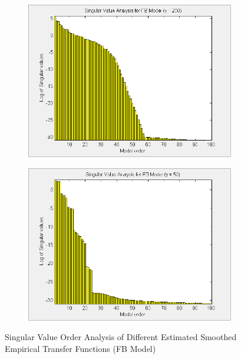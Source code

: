 \begin{landscape}
\begin{figure}[H]
\begin{subfigure}[b]{0.38\textwidth}
\label{pic:}
\end{subfigure}\;\begin{subfigure}[b]{0.38\textwidth}
\includegraphics[width=1.0\textwidth]{pics/SVD_FB_200}

\label{pic:}
\end{subfigure}\;\begin{subfigure}[b]{0.38\textwidth}
\includegraphics[width=1.0\textwidth]{pics/SVD_FB_50}

\label{pic:}
\end{subfigure}
\caption{Singular Value Order Analysis of Different Estimated Smoothed Empirical Transfer Functions (FB Model)}
\end{figure}


\end{landscape}
